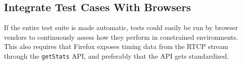 \subsection{Integrate Test Cases With Browsers}

If the entire test suite is made automatic, tests could easily be run by browser vendors to continuously assess how they perform in constrained environments. This also requires that Firefox exposes timing data from the RTCP stream through the \texttt{getStats} API, and preferably that the API gets standardized.

